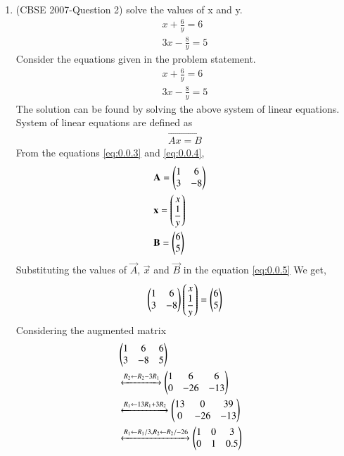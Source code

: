 \documentclass[journal,12pt,twocolumn]{IEEEtran}
\begin{document}
\begin{enumerate}

\item (CBSE 2007-Question 2)
solve the values of x and y.
\begin{align}
&x+\displaystyle\frac{6}{y}=6 & \\ 
&3x-\displaystyle\frac{8}{y}=5&
\end{align}
\solution Consider the equations  given in the problem statement.
\begin{align}
&x+\displaystyle\frac{6}{y}=6 \label{eq:0.0.3} &\\
&3x-\displaystyle\frac{8}{y}=5 \label{eq:0.0.4} &
\end{align}
The solution can be found by solving the above system of linear equations.\\ 
System of linear equations are defined as 
\begin{align}
\vec{Ax=B}\label{eq:0.0.5}
\end{align}
From the equations \eqref{eq:0.0.3} and \eqref{eq:0.0.4}, 
\begin{align}
&\vec{A}= \myvec{1 &6\\3  & -8}&\\
\medskip
&\vec{x}= \myvec{ x\\ \displaystyle\frac{1}{y}}&\\
\medskip
&\vec{B}= \myvec{6\\5} & 
\end{align} 
Substituting the values of $\vec{A}$, $\vec{x}$ and $\vec{B}$ in the equation \eqref{eq:0.0.5}
We get,
\begin{align}
\begin{pmatrix}1&6\\3&-8\end{pmatrix} \begin{pmatrix}x\\\displaystyle\frac{1}{y}\end{pmatrix}= \begin{pmatrix}6\\5\end{pmatrix}
\end{align}
Considering the augmented matrix 
 \begin{align}
  &\begin{pmatrix}1&6&6\\3&-8&5\end{pmatrix}&\\ 
& \xleftrightarrow[]{ R_2 \leftarrow R_2 - 3R_1}
  \begin{pmatrix}1&6&6\\0&-26&-13\end{pmatrix}&\\
  & \xleftrightarrow[]{ R_1 \leftarrow 13R_1 + 3R_2}
  \begin{pmatrix}13&0&39\\0&-26&-13\end{pmatrix}&\\
   & \xleftrightarrow[]{ R_1 \leftarrow R_1/3,R_2 \leftarrow R_2/-26}
  \begin{pmatrix}1&0&3\\0&1&0.5\end{pmatrix}&
 \end{align}

\end{enumerate}
\end{document}
